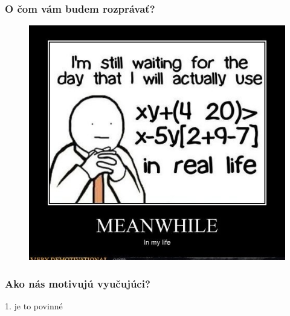 \documentclass{beamer}
\begin{document}
\begin{frame}
\frametitle{O čom vám budem rozprávať?}
\begin{figure}
\includegraphics[height=0.8\textheight]{images/wait_to_use.jpg}
\end{figure}
\end{frame}


% 

% 

\begin{frame}
\frametitle{Ako nás motivujú vyučujúci?}
\begin{center}
{\Large 1. je to povinné}
\end{center}
\end{frame}
\end{document}
